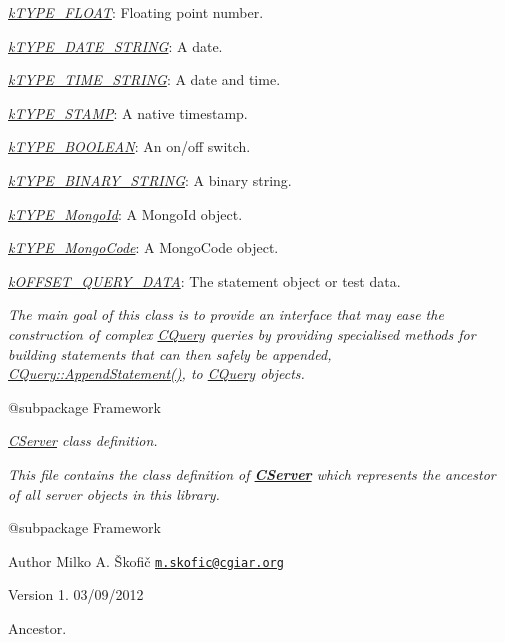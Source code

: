 {\begin{DoxyItemize}
\begin{DoxyItemize}
\item {\itshape \hyperlink{}{k\-T\-Y\-P\-E\-\_\-\-F\-L\-O\-A\-T}}\-: Floating point number. 
\item {\itshape \hyperlink{}{k\-T\-Y\-P\-E\-\_\-\-D\-A\-T\-E\-\_\-\-S\-T\-R\-I\-N\-G}}\-: A date. 
\item {\itshape \hyperlink{}{k\-T\-Y\-P\-E\-\_\-\-T\-I\-M\-E\-\_\-\-S\-T\-R\-I\-N\-G}}\-: A date and time. 
\item {\itshape \hyperlink{}{k\-T\-Y\-P\-E\-\_\-\-S\-T\-A\-M\-P}}\-: A native timestamp. 
\item {\itshape \hyperlink{}{k\-T\-Y\-P\-E\-\_\-\-B\-O\-O\-L\-E\-A\-N}}\-: An {\ttfamily on}/{\ttfamily off} switch. 
\item {\itshape \hyperlink{}{k\-T\-Y\-P\-E\-\_\-\-B\-I\-N\-A\-R\-Y\-\_\-\-S\-T\-R\-I\-N\-G}}\-: A binary string. 
\item {\itshape \hyperlink{}{k\-T\-Y\-P\-E\-\_\-\-Mongo\-Id}}\-: A Mongo\-Id object. 
\item {\itshape \hyperlink{}{k\-T\-Y\-P\-E\-\_\-\-Mongo\-Code}}\-: A Mongo\-Code object. 
\end{DoxyItemize}
\item {\itshape \hyperlink{}{k\-O\-F\-F\-S\-E\-T\-\_\-\-Q\-U\-E\-R\-Y\-\_\-\-D\-A\-T\-A}}\-: The statement object or test data. 
\end{DoxyItemize}}

{\itshape The main goal of this class is to provide an interface that may ease the construction of complex \hyperlink{class_c_query}{C\-Query} queries by providing specialised methods for building statements that can then safely be appended, \hyperlink{class_c_query_ab18afa41c5060767efc493497f5f82f7}{C\-Query\-::\-Append\-Statement()}, to \hyperlink{class_c_query}{C\-Query} objects.}

{\itshape \begin{DoxyVerb} @subpackage        Framework\end{DoxyVerb}
}

{\itshape {\itshape \hyperlink{class_c_server}{C\-Server}} class definition.}

{\itshape This file contains the class definition of {\bfseries \hyperlink{class_c_server}{C\-Server}} which represents the ancestor of all server objects in this library.}

{\itshape \begin{DoxyVerb} @subpackage        Framework
\end{DoxyVerb}
}

{\itshape \begin{DoxyAuthor}{Author}
Milko A. Škofič \href{mailto:m.skofic@cgiar.org}{\tt m.\-skofic@cgiar.\-org} 
\end{DoxyAuthor}
\begin{DoxyVersion}{Version}
1. 03/09/2012
\end{DoxyVersion}
Ancestor.}

